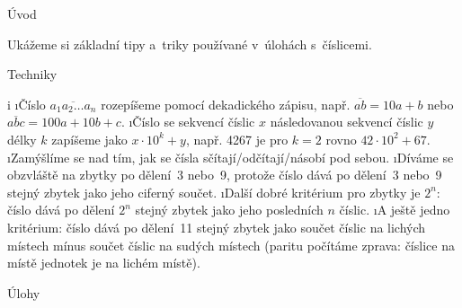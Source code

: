 





\sec Úvod

Ukážeme si základní tipy a~triky používané v~úlohách s~číslicemi.

\sec Techniky

\begitems \style i
\i Číslo $\overline{a_1a_2\dots a_n}$ rozepíšeme pomocí dekadického zápisu, např. $\overline{ab}=10a+b$ nebo $\overline{abc}=100a+10b+c$.
\i Číslo se sekvencí číslic $x$ následovanou sekvencí číslic $y$ délky $k$ zapíšeme jako $x \cdot 10^k + y$, např. 4267 je pro $k=2$ rovno $42 \cdot 10^2 + 67$.
\i Zamýšlíme se nad tím, jak se čísla sčítají/odčítají/násobí pod sebou.
\i Díváme se obzvláště na zbytky po dělení~3 nebo~9, protože číslo dává po dělení~3 nebo~9 stejný zbytek jako jeho ciferný součet.
\i Další dobré kritérium pro zbytky je $2^n$: číslo dává po dělení $2^n$ stejný zbytek jako jeho posledních $n$ číslic.
\i A ještě jedno kritérium: číslo dává po dělení~11 stejný zbytek jako součet číslic na lichých místech mínus součet číslic na sudých místech (paritu počítáme zprava: číslice na místě jednotek je na lichém místě).
\enditems

\sec Úlohy


